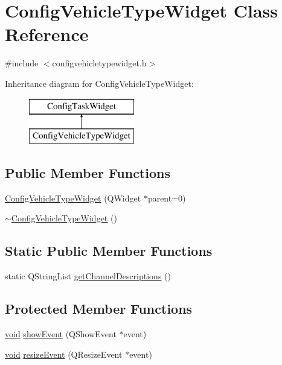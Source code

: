 \hypertarget{class_config_vehicle_type_widget}{\section{\-Config\-Vehicle\-Type\-Widget \-Class \-Reference}
\label{class_config_vehicle_type_widget}
}


{\ttfamily \#include $<$configvehicletypewidget.\-h$>$}

\-Inheritance diagram for \-Config\-Vehicle\-Type\-Widget\-:\begin{figure}[H]
\begin{center}
\leavevmode
\includegraphics[height=2.000000cm]{class_config_vehicle_type_widget}
\end{center}
\end{figure}
\subsection*{\-Public \-Member \-Functions}
\begin{DoxyCompactItemize}
\item 
\hyperlink{group___config_plugin_ga073c5b646c2487874d095f97989f4358}{\-Config\-Vehicle\-Type\-Widget} (\-Q\-Widget $\ast$parent=0)
\item 
\hyperlink{group___config_plugin_ga7edb0b23fc32af7728baa08038a79202}{$\sim$\-Config\-Vehicle\-Type\-Widget} ()
\end{DoxyCompactItemize}
\subsection*{\-Static \-Public \-Member \-Functions}
\begin{DoxyCompactItemize}
\item 
static \-Q\-String\-List \hyperlink{group___config_plugin_ga65301666bc0f14e94e8f718af4e6cc08}{get\-Channel\-Descriptions} ()
\end{DoxyCompactItemize}
\subsection*{\-Protected \-Member \-Functions}
\begin{DoxyCompactItemize}
\item 
\hyperlink{group___u_a_v_objects_plugin_ga444cf2ff3f0ecbe028adce838d373f5c}{void} \hyperlink{group___config_plugin_gab830a9c8fbb8c286953a005382701f94}{show\-Event} (\-Q\-Show\-Event $\ast$event)
\item 
\hyperlink{group___u_a_v_objects_plugin_ga444cf2ff3f0ecbe028adce838d373f5c}{void} \hyperlink{group___config_plugin_gaa35315a56ddec502ecc1c683b51364d8}{resize\-Event} (\-Q\-Resize\-Event $\ast$event)
\end{DoxyCompactItemize}


